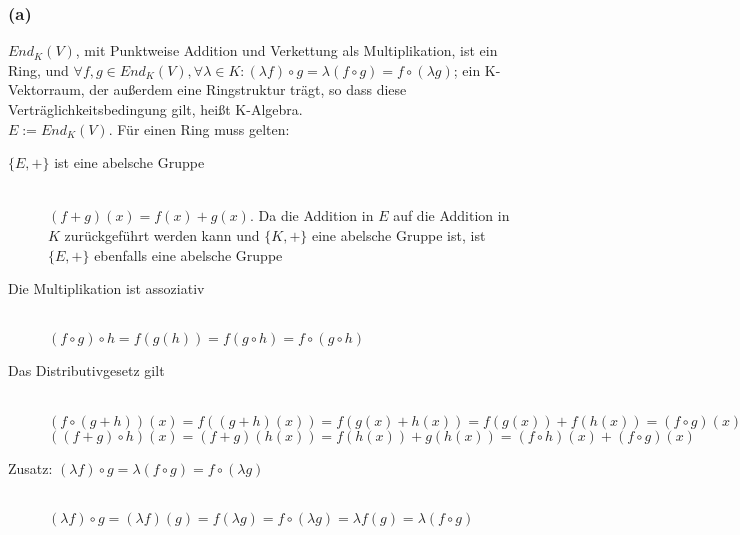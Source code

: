 \documentclass[12pt]{article}
\begin{document}
\subsubsection*{(a)}$End_K(V)$, mit Punktweise Addition und Verkettung als Multiplikation, ist ein Ring, und $\forall f,g{\in}End_K(V), \forall\lambda{\in}K: ({\lambda}f){\circ}g={\lambda}(f{\circ}g)=f{\circ}({\lambda}g)$; ein K-Vektorraum, der au{\ss}erdem eine Ringstruktur tr{\"a}gt, so dass diese Vertr{\"a}glichkeitsbedingung gilt, hei{\ss}t K-Algebra.\\
$E:=End_K(V)$. F{\"u}r einen Ring muss gelten:
\begin{description}
\item[$\{E,+\}$ ist eine abelsche Gruppe]\hfill \\
$(f+g)(x)=f(x)+g(x).$ Da die Addition in $E$ auf die Addition in $K$ zur{\"u}ckgef{\"u}hrt werden kann und $\{K,+\}$ eine abelsche Gruppe ist, ist $\{E,+\}$ ebenfalls eine abelsche Gruppe
\item[Die Multiplikation ist assoziativ]\hfill \\
$(f{\circ}g){\circ}h=f(g(h))=f(g{\circ}h)=f{\circ}(g{\circ}h)$
\item[Das Distributivgesetz gilt]\hfill \\
$(f{\circ}(g+h))(x)=f((g+h)(x))=f(g(x)+h(x))=f(g(x))+f(h(x))=(f{\circ}g)(x))+(f{\circ}h)(x)$\\
$((f+g){\circ}h)(x)=(f+g)(h(x))=f(h(x))+g(h(x))=(f{\circ}h)(x)+(f{\circ}g)(x)$
\item[Zusatz: $({\lambda}f){\circ}g=\lambda(f{\circ}g)=f{\circ}({\lambda}g)$]\hfill \\
$({\lambda}f){\circ}g=({\lambda}f)(g)=f({\lambda}g)=f{\circ}({\lambda}g)={\lambda}f(g)={\lambda}(f{\circ}g)$
\end{description}
\end{document}
